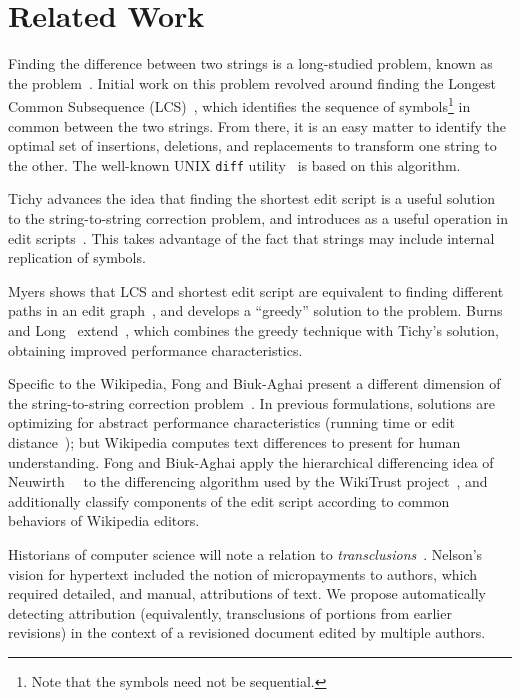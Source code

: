\section{Related Work}
\label{sec:diff-related}

Finding the difference between two strings is a long-studied problem,
known as the  problem~\cite{Wagner1974}.
Initial work on this problem revolved around finding the
Longest Common Subsequence (LCS)~\cite{Gusfield1999}, which identifies the
sequence of symbols\footnote{Note that the symbols need not be sequential.}
in common between the two strings.
From there, it is an easy matter to identify the optimal
set of insertions, deletions, and replacements to transform
one string to the other.
The well-known UNIX \texttt{diff} utility~\cite{Hunt1976} is based
on this algorithm.

Tichy advances the idea that finding the shortest edit script is a
useful solution to the string-to-string correction problem, and
introduces  as a useful operation in edit
scripts~\cite{Tichy1984}.
This takes advantage of the fact that strings may include internal
replication of symbols.

Myers shows that LCS and shortest edit script are equivalent to finding
different paths in an edit graph~\cite{Myers1986}, and develops a
``greedy'' solution to the problem.
Burns and Long~\cite{Burns1997} extend~\cite{Reichenberger1991},
which combines the greedy technique with Tichy's solution,
obtaining improved performance characteristics.

Specific to the Wikipedia, Fong and Biuk-Aghai present a different
dimension of the string-to-string correction problem~\cite{Fong2010}.
In previous formulations, solutions are optimizing for abstract
performance characteristics (\eg running time or
edit distance~\cite{Levenshtein1966}); but Wikipedia computes text differences
to present for human understanding.
Fong and Biuk-Aghai apply the hierarchical differencing idea of
Neuwirth~\etal~\cite{Neuwirth1992} to the differencing algorithm used by the
WikiTrust project~\cite{Adler2007}, and additionally classify components
of the edit script according to common behaviors of Wikipedia editors.

Historians of computer science will note a relation
to \textit{transclusions}~\cite{Nelson81}.
Nelson's vision for hypertext included the notion
of micropayments to authors, which required detailed,
and manual, attributions of text.
We propose automatically detecting attribution
(equivalently, transclusions of portions from earlier revisions)
in the context of a revisioned document edited
by multiple authors.



